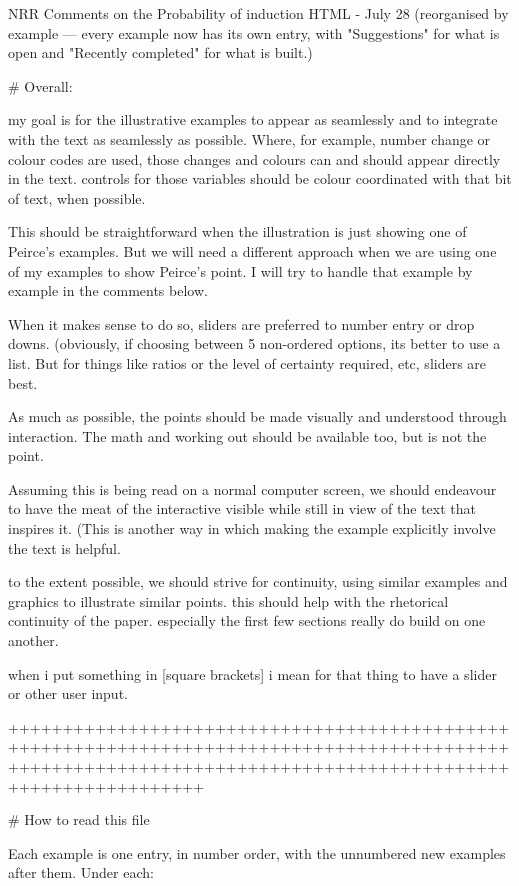 NRR Comments on the Probability of induction HTML - July 28
(reorganised by example — every example now has its own entry, with
"Suggestions" for what is open and "Recently completed" for what is built.)

# Overall:

my goal is for the illustrative examples to appear as seamlessly and to integrate with the text as seamlessly as possible. Where, for example, number change or colour codes are used, those changes and colours can and should appear directly in the text. controls for those variables should be colour coordinated with that bit of text, when possible.

This should be straightforward when the illustration is just showing one of Peirce's examples. But we will need a different approach when we are using one of my examples to show Peirce's point. I will try to handle that example by example in the comments below.

When it makes sense to do so, sliders are preferred to number entry or drop downs. (obviously, if choosing between 5 non-ordered options, its better to use a list. But for things like ratios or the level of certainty required, etc, sliders are best.

As much as possible, the points should be made visually and understood through interaction. The math and working out should be available too, but is not the point.

Assuming this is being read on a normal computer screen, we should endeavour to have the meat of the interactive visible while still in view of the text that inspires it. (This is another way in which making the example explicitly involve the text is helpful.

to the extent possible, we should strive for continuity, using similar examples and graphics to illustrate similar points. this should help with the rhetorical continuity of the paper. especially the first few sections really do build on one another.

when i put something in [square brackets] i mean for that thing to have a slider or other user input.


++++++++++++++++++++++++++++++++++++++++++++++++++++++++++++++++++++++++++++++++++++++++++++++++++++++++++++++++++++++++++++++++++++++++++++++++++++++++++++

# How to read this file

Each example is one entry, in number order, with the unnumbered new examples
after them. Under each:

